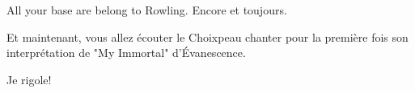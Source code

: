 All your base are belong to Rowling. Encore et toujours.

Et maintenant, vous allez écouter le Choixpeau chanter pour la première fois son interprétation de "My Immortal" d'Évanescence.

Je rigole!

